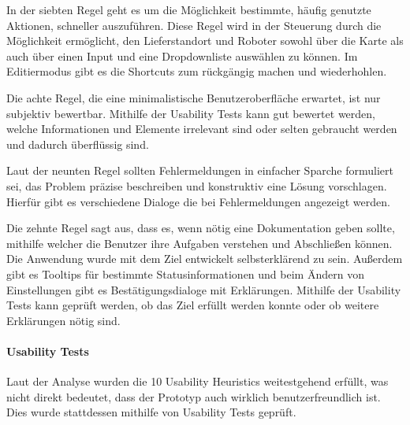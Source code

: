 In der siebten Regel geht es um die Möglichkeit bestimmte, häufig genutzte Aktionen, schneller auszuführen. Diese Regel wird in der Steuerung durch die Möglichkeit ermöglicht, den Lieferstandort und Roboter sowohl über die Karte als auch über einen Input und eine Dropdownliste auswählen zu können. Im Editiermodus gibt es die Shortcuts zum rückgängig machen und wiederhohlen.

Die achte Regel, die eine minimalistische Benutzeroberfläche erwartet, ist nur subjektiv bewertbar. Mithilfe der Usability Tests kann gut bewertet werden, welche Informationen und Elemente irrelevant sind oder selten gebraucht werden und dadurch überflüssig sind.

Laut der neunten Regel sollten Fehlermeldungen in einfacher Sparche formuliert sei, das Problem präzise beschreiben und konstruktiv eine Lösung vorschlagen. Hierfür gibt es verschiedene Dialoge die bei Fehlermeldungen angezeigt werden.

Die zehnte Regel sagt aus, dass es, wenn nötig eine Dokumentation geben sollte, mithilfe welcher die Benutzer ihre Aufgaben verstehen und Abschließen können. Die Anwendung wurde mit dem Ziel entwickelt selbsterklärend zu sein. 
Außerdem gibt es Tooltips für bestimmte Statusinformationen und beim Ändern von Einstellungen gibt es Bestätigungsdialoge mit Erklärungen. Mithilfe der Usability Tests kann geprüft werden, ob das Ziel erfüllt werden konnte oder ob weitere Erklärungen nötig sind.

\paragraph{Usability Tests}
Laut der Analyse wurden die 10 Usability Heuristics weitestgehend erfüllt, was nicht direkt bedeutet, dass der Prototyp auch wirklich benutzerfreundlich ist. Dies wurde stattdessen mithilfe von Usability Tests geprüft.


